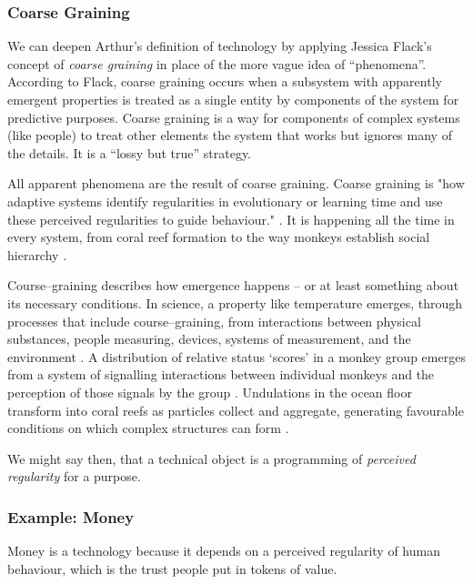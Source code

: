 \documentclass[letterpaper]{article}
\begin{document}
    \subsubsection{Coarse Graining}
    
    We can deepen Arthur's definition of technology by applying Jessica Flack's concept of \emph{coarse graining} in place of the more vague idea of “phenomena”. According to Flack, coarse graining occurs when a subsystem with apparently emergent properties is treated as a single entity by components of the system for predictive purposes. Coarse graining is a way for components of complex systems (like people) to treat other elements the system that works but ignores many of the details. It is a “lossy but true” \citep[p.4]{FlackCrsGrnng2017} strategy.
    
    All apparent phenomena are the result of coarse graining. Coarse graining is "how adaptive systems identify regularities in evolutionary or learning time and use these perceived regularities to guide behaviour." \citep[p.2]{FlackCrsGrnng2017}. It is happening all the time in every system, from coral reef formation \citep[p.61]{FlackEtAlTmsclsSymmtryUncrtnty2013} to the way monkeys establish social hierarchy \citep{FlackCntxtMdltsSgnlMnng2007}.

    Course–graining describes how emergence happens – or at least something about its necessary conditions. In science, a property like temperature emerges, through processes that include course–graining, from interactions between physical substances, people measuring, devices, systems of measurement, and the environment \citep[p.4]{FlackCrsGrnng2017}. A distribution of relative status ‘scores’ in a monkey group emerges from a system of signalling interactions between individual monkeys and the perception of those signals by the group \citep{FlackCntxtMdltsSgnlMnng2007}. Undulations in the ocean floor transform into coral reefs as particles collect and aggregate, generating favourable conditions on which complex structures can form \citep[p.61]{FlackEtAlTmsclsSymmtryUncrtnty2013}.
    
    We might say then, that a technical object is a programming of \emph{perceived regularity} for a purpose.

    \subsubsection{Example: Money}

    Money is a technology because it depends on a perceived regularity of human behaviour, which is the trust people put in tokens of value.
\end{document}
